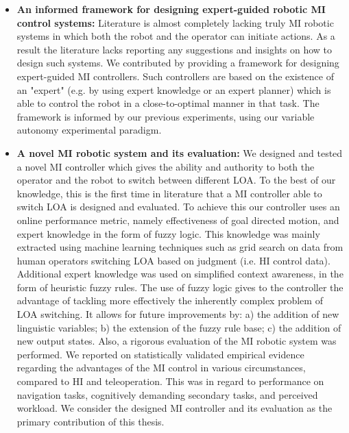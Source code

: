 \documentclass[a4paper,12pt,oneside,openright]{bhamthesis}
\begin{document}
\begin{itemize}
    \item \textbf{An informed framework for designing expert-guided robotic MI control systems:} Literature is almost completely lacking truly MI robotic systems in which both the robot and the operator can initiate actions. As a result the literature lacks reporting any suggestions and insights on how to design such systems. We contributed by providing a framework for designing expert-guided MI controllers. Such controllers are based on the existence of an "expert" (e.g. by using expert knowledge or an expert planner) which is able to control the robot in a close-to-optimal manner in that task. The framework is informed by our previous experiments, using our variable autonomy experimental paradigm.
    
	\item \textbf{A novel MI robotic system and its evaluation:} We designed and tested a novel MI controller which gives the ability and authority to both the operator and the robot to switch between different LOA. To the best of our knowledge, this is the first time in literature that a MI controller able to switch LOA is designed and evaluated. To achieve this our controller uses an online performance metric, namely effectiveness of goal directed motion, and expert knowledge in the form of fuzzy logic. This knowledge was mainly extracted using machine learning techniques such as grid search on data from human operators switching LOA based on judgment (i.e. HI control data). Additional expert knowledge was used on simplified context awareness, in the form of heuristic fuzzy rules. The use of fuzzy logic gives to the controller the advantage of tackling more effectively the inherently complex problem of LOA switching. It allows for future improvements by: a) the addition of new linguistic variables; b) the extension of the fuzzy rule base; c) the addition of new output states. Also, a rigorous evaluation of the MI robotic system was performed. We reported on statistically validated empirical evidence regarding the advantages of the MI control in various circumstances, compared to HI and teleoperation. This was in regard to performance on navigation tasks, cognitively demanding secondary tasks, and perceived workload. We consider the designed MI controller and its evaluation as the primary contribution of this thesis.
    

\end{itemize}
\end{document}
